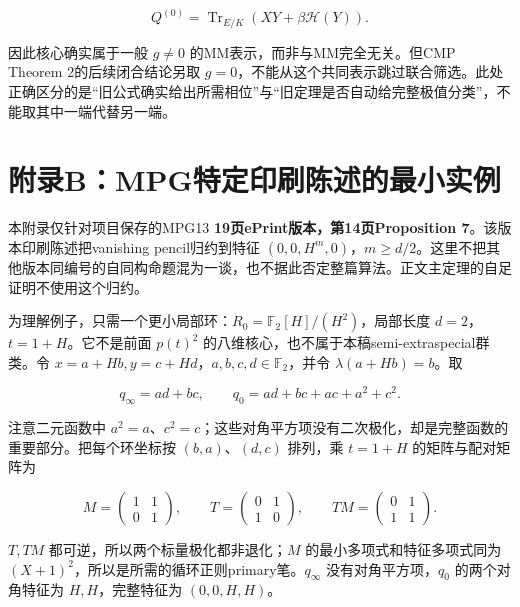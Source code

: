 \documentclass[UTF8,fontset=fandol,zihao=-4,openany,oneside]{ctexbook}
\begin{document}
\[
Q^{(0)}=\operatorname{Tr}_{E/K}
\left(XY+\beta\mathcal H(Y)\right).
\]



因此核心确实属于一般 \(g\ne0\) 的MM表示，而非与MM完全无关。但CMP Theorem 2的后续闭合结论另取 \(g=0\)，不能从这个共同表示跳过联合筛选。此处正确区分的是“旧公式确实给出所需相位”与“旧定理是否自动给完整极值分类”，不能取其中一端代替另一端。



\section{附录B：MPG特定印刷陈述的最小实例}


本附录仅针对项目保存的MPG13 \textbf{19页ePrint版本，第14页Proposition 7}。该版本印刷陈述把vanishing pencil归约到特征 \((0,0,H^m,0)\)，\(m\ge d/2\)。这里不把其他版本同编号的自同构命题混为一谈，也不据此否定整篇算法。正文主定理的自足证明不使用这个归约。



为理解例子，只需一个更小局部环：\(R_0=\mathbb F_2[H]/(H^2)\)，局部长度 \(d=2\)，\(t=1+H\)。它不是前面 \(p(t)^2\) 的八维核心，也不属于本稿semi-extraspecial群类。令 \(x=a+Hb,y=c+Hd\)，\(a,b,c,d\in\mathbb F_2\)，并令 \(\lambda(a+Hb)=b\)。取



\[
q_\infty=ad+bc,\qquad
q_0=ad+bc+ac+a^2+c^2.
\]



注意二元函数中 \(a^2=a\)、\(c^2=c\)；这些对角平方项没有二次极化，却是完整函数的重要部分。把每个环坐标按 \((b,a)\)、\((d,c)\) 排列，乘 \(t=1+H\) 的矩阵与配对矩阵为



\[
M=\begin{pmatrix}1&1\\0&1\end{pmatrix},\qquad
T=\begin{pmatrix}0&1\\1&0\end{pmatrix},\qquad
TM=\begin{pmatrix}0&1\\1&1\end{pmatrix}.
\]



\(T,TM\) 都可逆，所以两个标量极化都非退化；\(M\) 的最小多项式和特征多项式同为 \((X+1)^2\)，所以是所需的循环正则primary笔。\(q_\infty\) 没有对角平方项，\(q_0\) 的两个对角特征为 \(H,H\)，完整特征为 \((0,0,H,H)\)。
\end{document}
